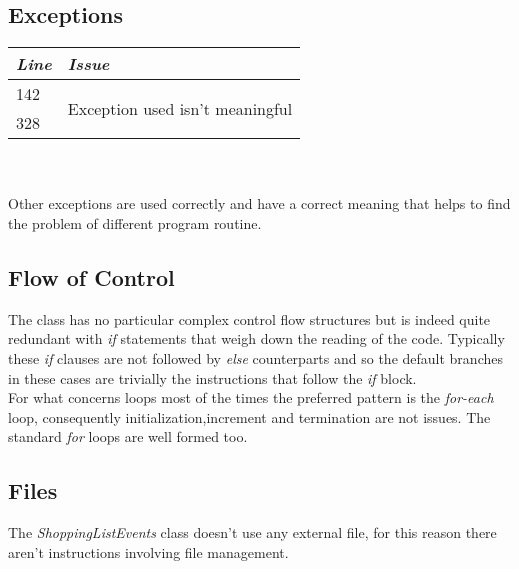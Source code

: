 \documentclass[11pt,a4paper]{report}
\begin{document}
\subsection{Exceptions}
\begin{tabularx}{\textwidth}{|l|X|}
	\hline
	\textit{Line} & \textit{Issue}\\
	\hline
	\hline
	142 & \multirow{2}{*}{Exception used isn't meaningful}\\
	328 & \\
	\hline
\end{tabularx}\\
\\
Other exceptions are used correctly and have a correct meaning that helps to find the problem of different program routine.
\subsection{Flow of Control}
The class has no particular complex control flow structures but is indeed quite redundant with \textit{if} statements that weigh down the reading of the code. Typically these \textit{if} clauses are not followed by \textit{else} counterparts and so the default branches in these cases are trivially the instructions that follow the \textit{if} block.\\For what concerns loops most of the times the preferred pattern is the \textit{for-each} loop, consequently initialization,increment and termination are not issues. The standard \textit{for} loops are well formed too.
\subsection{Files}
The \textit{ShoppingListEvents} class doesn't use any external file, for this reason there aren't instructions involving file management.
\end{document}
